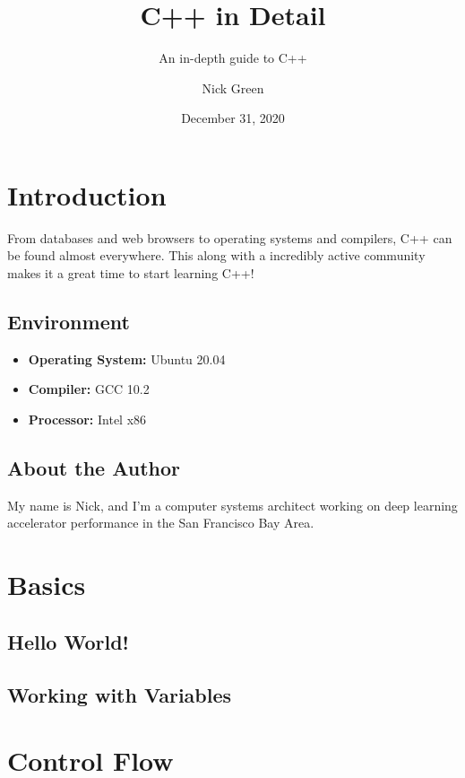 \documentclass[11pt,fancy,authoryear]{elegantbook}
\title{C++ in Detail}
\subtitle{An in-depth guide to C++}
\author{Nick Green}
\institute{CoffeeBeforeArch}
\date{December 31, 2020}
\begin{document}
\maketitle

\frontmatter
\tableofcontents

\mainmatter

\chapter{Introduction}

From databases and web browsers to operating systems and compilers, C++ can be found almost everywhere. This along with a incredibly active community makes it a great time to start learning C++!

\section{Environment}

\begin{itemize}
  \item \textbf{Operating System: } Ubuntu 20.04
  \item \textbf{Compiler: } GCC 10.2
  \item \textbf{Processor: } Intel x86
\end{itemize}

\section{About the Author}

My name is Nick, and I'm a computer systems architect working on deep learning accelerator performance in the San Francisco Bay Area.

\chapter{Basics}

\section{Hello World!}

\section{Working with Variables}

\chapter{Control Flow}
\end{document}
